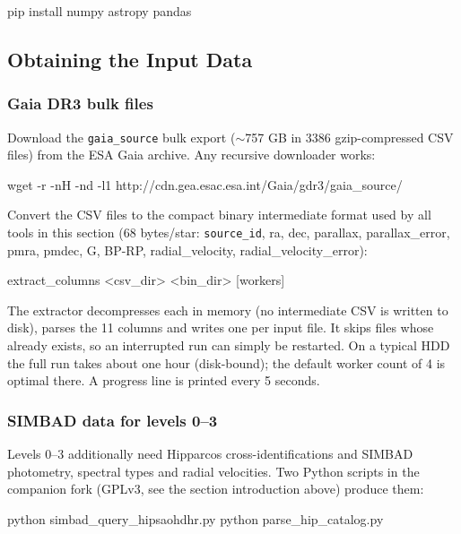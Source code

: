 \begin{commands}
pip install numpy astropy pandas
\end{commands}

\subsection{Obtaining the Input Data}
\label{sec:StarCatalogues:Generating:Data}

\subsubsection{Gaia DR3 bulk files}

Download the \texttt{gaia\_source} bulk export ($\sim$757 GB in 3386
gzip-compressed CSV files) from the ESA Gaia archive. Any recursive
downloader works:

\begin{commands}
wget -r -nH -nd -l1
        http://cdn.gea.esac.esa.int/Gaia/gdr3/gaia_source/
\end{commands}

Convert the CSV files to the compact binary intermediate format used by all
tools in this section (68 bytes/star: \texttt{source\_id}, ra, dec,
parallax, parallax\_error, pmra, pmdec, G, BP-RP, radial\_velocity,
radial\_velocity\_error):

\begin{commands}
extract_columns <csv_dir> <bin_dir>
        [workers]
\end{commands}

The extractor decompresses each  in memory (no intermediate
CSV is written to disk), parses the 11 columns and writes one 
per input file. It skips files whose  already exists, so an
interrupted run can simply be restarted. On a typical HDD the full run takes
about one hour (disk-bound); the default worker count of 4 is optimal there.
A progress line is printed every 5 seconds.

\subsubsection{SIMBAD data for levels 0--3}

Levels 0--3 additionally need Hipparcos cross-identifications and SIMBAD
photometry, spectral types and radial velocities. Two Python scripts in the
companion fork (GPLv3, see the section introduction above) produce them:

\begin{commands}
python simbad_query_hipsaohdhr.py
python parse_hip_catalog.py
\end{commands}


